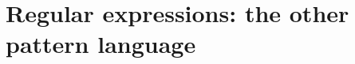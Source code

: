 \chapter{Regular expressions: the other pattern language}
\label{ch:regular-expressions-the-other-pattern}

